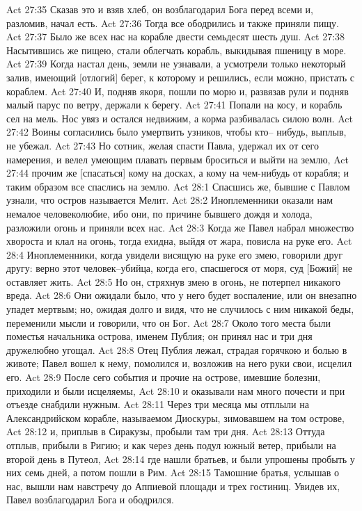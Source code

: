 Act 27:35  Сказав это и взяв хлеб, он возблагодарил Бога перед всеми и, разломив, начал есть.
Act 27:36  Тогда все ободрились и также приняли пищу.
Act 27:37  Было же всех нас на корабле двести семьдесят шесть душ.
Act 27:38  Насытившись же пищею, стали облегчать корабль, выкидывая пшеницу в море.
Act 27:39  Когда настал день, земли не узнавали, а усмотрели только некоторый залив, имеющий [отлогий] берег, к которому и решились, если можно, пристать с кораблем.
Act 27:40  И, подняв якоря, пошли по морю и, развязав рули и подняв малый парус по ветру, держали к берегу.
Act 27:41  Попали на косу, и корабль сел на мель. Нос увяз и остался недвижим, а корма разбивалась силою волн.
Act 27:42  Воины согласились было умертвить узников, чтобы кто-- нибудь, выплыв, не убежал.
Act 27:43  Но сотник, желая спасти Павла, удержал их от сего намерения, и велел умеющим плавать первым броситься и выйти на землю,
Act 27:44  прочим же [спасаться] кому на досках, а кому на чем-нибудь от корабля; и таким образом все спаслись на землю.
Act 28:1  Спасшись же, бывшие с Павлом узнали, что остров называется Мелит.
Act 28:2  Иноплеменники оказали нам немалое человеколюбие, ибо они, по причине бывшего дождя и холода, разложили огонь и приняли всех нас.
Act 28:3  Когда же Павел набрал множество хвороста и клал на огонь, тогда ехидна, выйдя от жара, повисла на руке его.
Act 28:4  Иноплеменники, когда увидели висящую на руке его змею, говорили друг другу: верно этот человек--убийца, когда его, спасшегося от моря, суд [Божий] не оставляет жить.
Act 28:5  Но он, стряхнув змею в огонь, не потерпел никакого вреда.
Act 28:6  Они ожидали было, что у него будет воспаление, или он внезапно упадет мертвым; но, ожидая долго и видя, что не случилось с ним никакой беды, переменили мысли и говорили, что он Бог.
Act 28:7  Около того места были поместья начальника острова, именем Публия; он принял нас и три дня дружелюбно угощал.
Act 28:8  Отец Публия лежал, страдая горячкою и болью в животе; Павел вошел к нему, помолился и, возложив на него руки свои, исцелил его.
Act 28:9  После сего события и прочие на острове, имевшие болезни, приходили и были исцеляемы,
Act 28:10  и оказывали нам много почести и при отъезде снабдили нужным.
Act 28:11  Через три месяца мы отплыли на Александрийском корабле, называемом Диоскуры, зимовавшем на том острове,
Act 28:12  и, приплыв в Сиракузы, пробыли там три дня.
Act 28:13  Оттуда отплыв, прибыли в Ригию; и как через день подул южный ветер, прибыли на второй день в Путеол,
Act 28:14  где нашли братьев, и были упрошены пробыть у них семь дней, а потом пошли в Рим.
Act 28:15  Тамошние братья, услышав о нас, вышли нам навстречу до Аппиевой площади и трех гостиниц. Увидев их, Павел возблагодарил Бога и ободрился.

